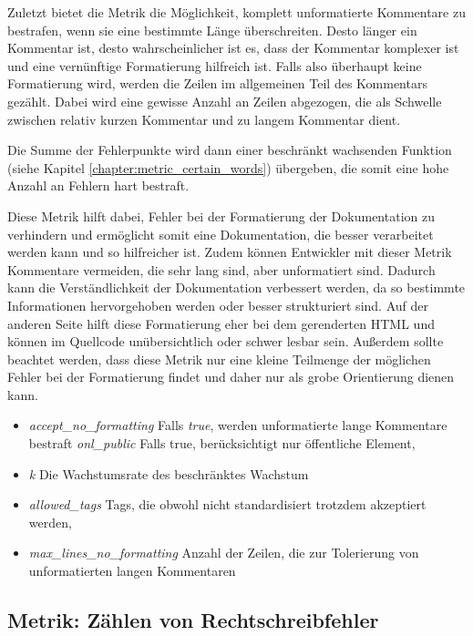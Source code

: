 Zuletzt bietet die Metrik die Möglichkeit, komplett unformatierte Kommentare zu bestrafen, wenn sie eine bestimmte Länge überschreiten. Desto länger ein Kommentar ist, desto wahrscheinlicher ist es, dass der Kommentar komplexer ist und eine vernünftige Formatierung hilfreich ist. Falls also überhaupt keine Formatierung wird, werden die Zeilen im allgemeinen Teil des Kommentars gezählt. Dabei wird  eine gewisse Anzahl an Zeilen abgezogen, die als Schwelle zwischen relativ kurzen Kommentar und zu langem Kommentar dient. 

Die Summe der Fehlerpunkte wird dann einer beschränkt wachsenden Funktion (siehe Kapitel \ref{chapter:metric_certain_words}) übergeben, die somit eine hohe Anzahl an Fehlern hart bestraft.

Diese Metrik hilft dabei, Fehler bei der Formatierung der Dokumentation zu verhindern und ermöglicht somit eine Dokumentation, die besser verarbeitet werden kann und so hilfreicher ist. Zudem können Entwickler mit dieser Metrik Kommentare vermeiden, die sehr lang sind, aber unformatiert sind. Dadurch kann die Verständlichkeit der Dokumentation verbessert werden, da so bestimmte Informationen hervorgehoben werden oder besser strukturiert sind. Auf der anderen Seite hilft diese Formatierung eher bei dem gerenderten \ac{HTML} und können im Quellcode unübersichtlich oder schwer lesbar sein. Außerdem sollte beachtet werden, dass diese Metrik nur eine kleine Teilmenge der möglichen Fehler bei der Formatierung findet und daher nur als grobe Orientierung dienen kann. 

 \begin{itemize}
    \item \textit{accept\_no\_formatting} Falls \textit{true}, werden unformatierte lange Kommentare bestraft
    \textit{onl\_public} Falls true, berücksichtigt nur öffentliche Element,
    \item \textit{k} Die Wachstumsrate des beschränktes Wachstum
     \item \textit{allowed\_tags} Tags, die obwohl nicht standardisiert trotzdem akzeptiert werden,
    \item \textit{max\_lines\_no\_formatting} Anzahl der Zeilen, die zur Tolerierung von unformatierten langen Kommentaren  
 \end{itemize}
 \subsection{Metrik: Zählen von Rechtschreibfehler}\label{chapter:metric_spelling}
 
